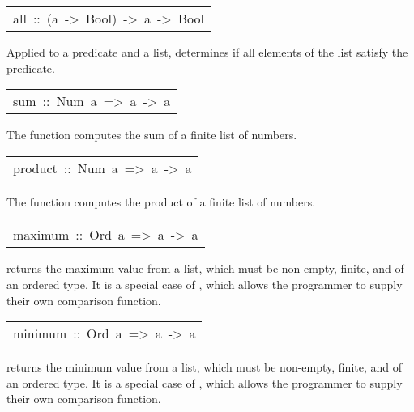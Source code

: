 \begin{haddockdesc}
\item[\begin{tabular}{@{}l}
all\ ::\ (a\ ->\ Bool)\ ->\ {\char 91}a{\char 93}\ ->\ Bool
\end{tabular}]\haddockbegindoc
Applied to a predicate and a list,  determines if all elements
 of the list satisfy the predicate.
\par

\end{haddockdesc}
\begin{haddockdesc}
\item[\begin{tabular}{@{}l}
sum\ ::\ Num\ a\ =>\ {\char 91}a{\char 93}\ ->\ a
\end{tabular}]\haddockbegindoc
The  function computes the sum of a finite list of numbers.
\par

\end{haddockdesc}
\begin{haddockdesc}
\item[\begin{tabular}{@{}l}
product\ ::\ Num\ a\ =>\ {\char 91}a{\char 93}\ ->\ a
\end{tabular}]\haddockbegindoc
The  function computes the product of a finite list of numbers.
\par

\end{haddockdesc}
\begin{haddockdesc}
\item[\begin{tabular}{@{}l}
maximum\ ::\ Ord\ a\ =>\ {\char 91}a{\char 93}\ ->\ a
\end{tabular}]\haddockbegindoc
{} returns the maximum value from a list,
 which must be non-empty, finite, and of an ordered type.
 It is a special case of , which allows the
 programmer to supply their own comparison function.
\par

\end{haddockdesc}
\begin{haddockdesc}
\item[\begin{tabular}{@{}l}
minimum\ ::\ Ord\ a\ =>\ {\char 91}a{\char 93}\ ->\ a
\end{tabular}]\haddockbegindoc
{} returns the minimum value from a list,
 which must be non-empty, finite, and of an ordered type.
 It is a special case of , which allows the
 programmer to supply their own comparison function.
\par

\end{haddockdesc}
